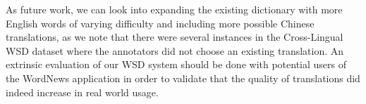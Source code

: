 \documentclass[11pt]{article}
\begin{document}
As future work, we can look into expanding the existing dictionary with more English words of varying difficulty and including more possible Chinese translations, as we note that there were several instances in the Cross-Lingual WSD dataset where the annotators did not choose an existing translation. An extrinsic evaluation of our WSD system should be done with potential users of the WordNews application in order to validate that the quality of translations did indeed increase in real world usage. 


%
%

%



\end{document}
